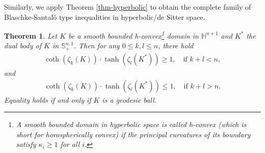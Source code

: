 \documentclass[11pt,reqno]{amsart}
\newtheorem{thm}{Theorem}[section]
\theoremstyle{definition}
\theoremstyle{remark}
\numberwithin{equation}{section}
\renewcommand{\(}{\left(}
\renewcommand{\)}{\right)}
\renewcommand{\~}{\tilde}
\renewcommand{\-}{\overline}
\renewcommand{\k}{\kappa}
\begin{document}
Similarly, we apply Theorem \ref{thm-hyperbolic} to obtain the complete family of Blaschke-Santal\'o type inequalities in hyperbolic/de Sitter space.
\begin{thm}\label{cor-BS-ineq-hyperbolic-extension}
	Let $K$ be a smooth bounded h-convex\footnote{A smooth bounded domain in hyperbolic space is called {\em h-convex} (which is short for {\em horospherically convex}) if the principal curvatures of its boundary satisfy $\k_i\geq 1$ for all $i$.} domain in $\mathbb H^{n+1}$ and $K^{\ast}$ the dual body of $K$ in $\mathbb S^{n,1}_{+}$. Then for any $0\leq k,l\leq n$, there hold
\begin{align}\label{s1:cor-hyperbolic-ineq-1}
\coth(\zeta_{k}(K)) \cdot \tanh(\zeta_l(K^\ast)) \geq 1, \quad \text{if $k+l<n$},
\end{align}
and
\begin{align}\label{s1:cor-hyperbolic-ineq-2}
\coth(\zeta_{k}(K)) \cdot \tanh(\zeta_l(K^\ast)) \leq 1, \quad \text{if $k+l>n$}.
\end{align}
Equality holds if and only if $K$ is a geodesic ball. 
\end{thm}
\end{document}
